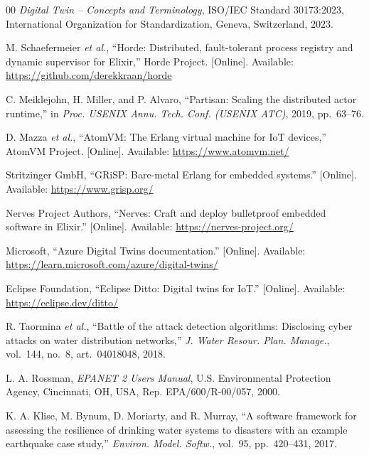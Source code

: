 \documentclass[conference]{IEEEtran}
\begin{document}
\begin{thebibliography}{00}
 \emph{Digital Twin -- Concepts and Terminology}, ISO/IEC Standard 30173:2023, International Organization for Standardization, Geneva, Switzerland, 2023.

 M. Schaefermeier \emph{et al.}, ``Horde: Distributed, fault-tolerant process registry and dynamic supervisor for Elixir,'' Horde Project. [Online]. Available: \url{https://github.com/derekkraan/horde}

 C. Meiklejohn, H. Miller, and P. Alvaro, ``Partisan: Scaling the distributed actor runtime,'' in \emph{Proc. USENIX Annu. Tech. Conf. (USENIX ATC)}, 2019, pp.~63--76.

 D. Mazza \emph{et al.}, ``AtomVM: The Erlang virtual machine for IoT devices,'' AtomVM Project. [Online]. Available: \url{https://www.atomvm.net/}

 Stritzinger GmbH, ``GRiSP: Bare-metal Erlang for embedded systems.'' [Online]. Available: \url{https://www.grisp.org/}

 Nerves Project Authors, ``Nerves: Craft and deploy bulletproof embedded software in Elixir.'' [Online]. Available: \url{https://nerves-project.org/}

 Microsoft, ``Azure Digital Twins documentation.'' [Online]. Available: \url{https://learn.microsoft.com/azure/digital-twins/}

 Eclipse Foundation, ``Eclipse Ditto: Digital twins for IoT.'' [Online]. Available: \url{https://eclipse.dev/ditto/}

 R. Taormina \emph{et al.}, ``Battle of the attack detection algorithms: Disclosing cyber attacks on water distribution networks,'' \emph{J. Water Resour. Plan. Manage.}, vol.~144, no.~8, art.~04018048, 2018.

 L. A. Rossman, \emph{EPANET 2 Users Manual}, U.S. Environmental Protection Agency, Cincinnati, OH, USA, Rep. EPA/600/R-00/057, 2000.

 K. A. Klise, M. Bynum, D. Moriarty, and R. Murray, ``A software framework for assessing the resilience of drinking water systems to disasters with an example earthquake case study,'' \emph{Environ. Model. Softw.}, vol.~95, pp.~420--431, 2017.

\end{thebibliography}
\end{document}
